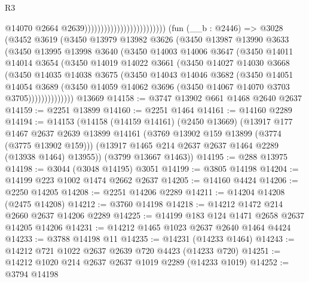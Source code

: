 \begin{lexlean}{R3}
\begin{coremodule}
                                                      @14070
                                                      @2664
                                                      @2639)))))))))))))))))))))))))
    (fun (__b : @2446) =>
    @3028
      (@3452
        @3619
        (@3450
          @13979
          @13982
          @3626
          (@3450
            @13987
            @13990
            @3633
            (@3450
              @13995
              @13998
              @3640
              (@3450
                @14003
                @14006
                @3647
                (@3450
                  @14011
                  @14014
                  @3654
                  (@3450
                    @14019
                    @14022
                    @3661
                    (@3450
                      @14027
                      @14030
                      @3668
                      (@3450
                        @14035
                        @14038
                        @3675
                        (@3450
                          @14043
                          @14046
                          @3682
                          (@3450
                            @14051
                            @14054
                            @3689
                            (@3450
                              @14059
                              @14062
                              @3696
                              (@3450 @14067 @14070 @3703 @3705))))))))))))))
    @13669
@14158 := @3747 @13902 @661 @1468 @2640 @2637
@14159 := @2251 @13899
@14160 := @2251 @1464
@14161 := @14160 @2289
@14194 := @14153
    (@14158
      (@14159 @14161)
      (@2450 @13669)
      (@13917
        @177
        @1467
        @2637
        @2639
        @13899
        @14161
        (@3769 @13902 @159 @13899 (@3774 (@3775 @13902 @159)))
        (@13917 @1465 @214 @2637 @2637 @1464 @2289 (@13938 @1464) @13955))
      (@3799 @13667 @1463))
@14195 := @288 @13975
@14198 := @3044 (@3048 @14195) @3051
@14199 := @3805 @14198
@14204 := @14199 @223 @1002 @1474 @2662 @2637
@14205 := @14160 @4424
@14206 := @2250 @14205
@14208 := @2251 @14206 @2289
@14211 := @14204 @14208 (@2475 @14208)
@14212 := @3760 @14198
@14218 := @14212 @1472 @214 @2660 @2637 @14206 @2289
@14225 := @14199 @183 @124 @1471 @2658 @2637 @14205 @14206
@14231 := @14212 @1465 @1023 @2637 @2640 @1464 @4424
@14233 := @3788 @14198 @11
@14235 := @14231 (@14233 @1464)
@14243 := @14212 @721 @1022 @2637 @2639 @720 @4423 (@14233 @720)
@14251 := @14212 @1020 @214 @2637 @2637 @1019 @2289 (@14233 @1019)
@14252 := @3794 @14198

\end{coremodule}
\end{lexlean}
